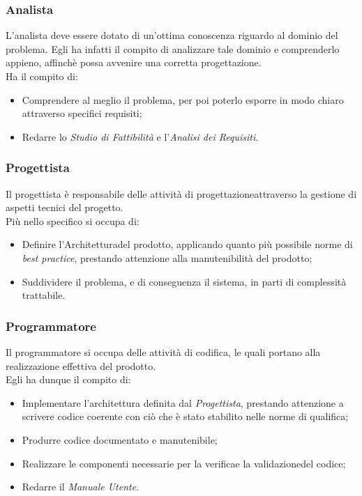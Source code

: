 \subsubsection{Analista}
	L'analista deve essere dotato di un'ottima conoscenza riguardo al dominio del problema. Egli ha infatti il 					compito di analizzare tale dominio e comprenderlo appieno, affinchè possa avvenire una corretta 											progettazione\glossario.\\
	Ha il compito di:
	\begin{itemize}
	\item Comprendere al meglio il problema, per poi poterlo esporre in modo chiaro attraverso specifici 									requisiti\glossario;
	\item Redarre lo \textit{Studio di Fattibilità} e l'\textit{Analisi dei Requisiti}\glossario.
	\end{itemize}

\subsubsection{Progettista}
	Il progettista è responsabile delle attività di progettazione\glossario attraverso la gestione di aspetti tecnici 	del progetto.\\
	Più nello specifico si occupa di:
	\begin{itemize}
	\item Definire l'Architettura\glossario del prodotto, applicando quanto più possibile norme di \textit{best 						practice}\glossario, prestando attenzione alla manutenibilità del prodotto;
	\item Suddividere il problema, e di conseguenza il sistema, in parti di complessità trattabile.
	\end{itemize}

\subsubsection{Programmatore}
	Il programmatore si occupa delle attività di codifica, le quali portano alla realizzazione effettiva del 						prodotto.\\
	Egli ha dunque il compito di:
	\begin{itemize}
	\item Implementare l'architettura definita dal \textit{Progettista}, prestando attenzione a scrivere codice 						coerente con ciò che è stato stabilito nelle norme di qualifica;
	\item Produrre codice documentato e manutenibile;
	\item Realizzare le componenti necessarie per la verifica\glossario e la validazione\glossario del codice;
	\item Redarre il \textit{Manuale Utente}.
	\end{itemize}

